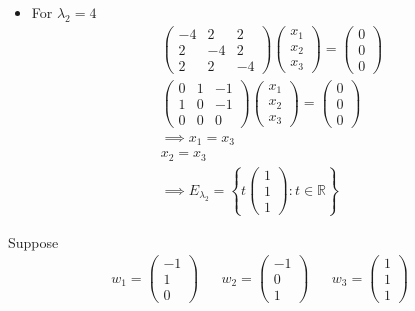 \begin{enumerate}
\begin{itemize}
\begin{gather}
\right\}
\end{gather}
\item For $\lambda_2 = 4$
\begin{gather}
\begin{pmatrix}
-4 & 2 & 2\\
2 & -4 & 2\\
2 & 2 & -4
\end{pmatrix}
\begin{pmatrix}
x_1\\x_2\\x_3
\end{pmatrix}
=
\begin{pmatrix}
0\\0\\0
\end{pmatrix}\\
\begin{pmatrix}
0 & 1 & -1\\
1 & 0 & -1\\
0 & 0 & 0
\end{pmatrix}
\begin{pmatrix}
x_1\\x_2\\x_3
\end{pmatrix}
=
\begin{pmatrix}
0\\0\\0
\end{pmatrix}\\
\implies x_1 = x_3\\
x_2 = x_3\\
\implies E_{\lambda_2} = \left\{
t\begin{pmatrix}1\\1\\1\end{pmatrix}\colon t \in \mathbb{R}
\right\}
\end{gather}
\end{itemize}
Suppose
\begin{align}
w_1 = \begin{pmatrix}-1\\1\\0\end{pmatrix} & & w_2
= \begin{pmatrix}-1\\0\\1\end{pmatrix} & & w_3 =\begin{pmatrix}1\\1\\1\end{pmatrix}

\end{align}
\end{enumerate}
